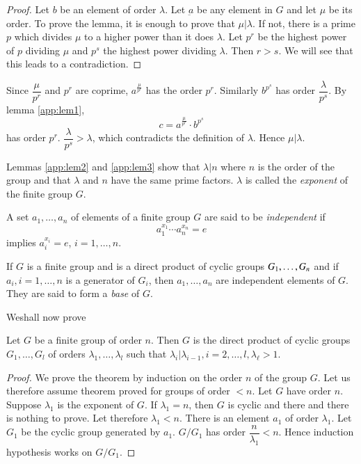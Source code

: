 \begin{proof}
Let $b$ be an element of order $\lambda$. Let $\underbar{a}$ be any
element in $G$ and let $\mu$ be its order. To prove the lemma, it is
enough to prove that $\mu | \lambda$. If not, there is a prime $p$
which divides $\mu$ to a higher power than it does $\lambda$. Let $p^r$
be the highest power of $p$ dividing $\mu$ and $p^s$ the highest power
dividing $\lambda$. Then $r > s$. We will see that this leads to a 
contradiction.       
\end{proof}

Since $\dfrac{\mu}{p^r}$ and $p^r$ are coprime,
$a^{\frac{\mu}{p^r}}$ has the order $p^r$. Similarly $b^{p^s}$
has order $\dfrac{\lambda}{p^s}$. By lemma \ref{app:lem1}, 
$$
c=a^{\frac{\mu}{p^r}} \cdot b^{p^s}
$$
has order $p^r$. $\dfrac{\lambda}{p^s} > \lambda$, which contradicts
the definition of $\lambda$. Hence $\mu |\lambda$.   

Lemmas \ref{app:lem2} and \ref{app:lem3} show that $\lambda | n$ where
$n$ is the order of the group and that $\lambda$ and $n$ have the same
prime factors. $\lambda$ is called the \textit{exponent} of the finite
group $G$.  

A set $a_1 , \ldots,a_n$ of elements of a finite group $G$ are said to
be \textit{independent} if  
$$
a_1^{x_1} \cdots a_n^{x_n} = e 
$$
implies $a^{x_i}_i = e$, $i=1 ,\ldots, n$.


If $G$ is a finite group and is a direct product of cyclic groups $G_1
,\break \ldots, G_n$ and if $a_i, i= 1 ,\ldots, n$ is a generator of $G_i$,
then $a_1 ,\ldots, a_n$ are independent elements of $G$. They are said
to form a \textit{base} of $G$.

 We\pageoriginale shall now prove  

\setcounter{thm}{0}
\begin{thm}\label{app:thm1}%
Let $G$ be a finite group of order $n$. Then $G$ is the direct
  product of cyclic groups $G_1 ,\ldots,G_l$ of orders  $\lambda_1
  ,\ldots,\lambda_l$  such that $\lambda_i | \lambda_{i-1}, i = 2 ,
  \ldots, l, \lambda_\ell >1 $. 
\end{thm}

\begin{proof}
We prove the theorem by induction on the order $n$ of the group
$G$. Let us therefore assume theorem proved for groups of order $ <
n$. Let $G$ have order $n$. Suppose $\lambda_1$ is the exponent of
$G$. If $\lambda_1 = n$, then $G$ is cyclic and there and there is
nothing to prove. Let therefore $\lambda_1 < n$. There is an element
$a_1$ of order $\lambda_1$. Let $G_1$ be the cyclic group generated by
$a_1$. $G/G_1$ has order $\dfrac{n}{\lambda_1} < n$. Hence
induction hypothesis works on $G/G_1$. 
\end{proof}

